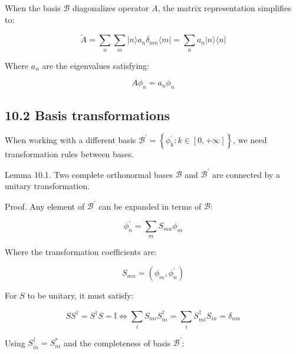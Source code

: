 \documentclass[10pt]{article}
\begin{document}
When the basis $\mathcal{B}$ diagonalizes operator $A$, the matrix representation simplifies to:

\begin{equation*}
\tilde{A}=\sum_{n} \sum_{m}|n\rangle a_{n} \delta_{n m}\langle m|=\sum_{n} a_{n}|n\rangle\langle n| \tag{10.9}
\end{equation*}

Where $a_n$ are the eigenvalues satisfying:

\begin{equation*}
A \phi_{n}=a_{n} \phi_{n} \tag{10.10}
\end{equation*}

\subsection*{10.2 Basis transformations}
When working with a different basis $\mathcal{B}^{\prime}=\left\{\phi_{k}^{\prime}: k \in[0,+\infty]\right\}$, we need transformation rules between bases.

Lemma 10.1. Two complete orthonormal bases $\mathcal{B}$ and $\mathcal{B}^{\prime}$ are connected by a unitary transformation.

Proof. Any element of $\mathcal{B}^{\prime}$ can be expanded in terms of $\mathcal{B}$:

\begin{equation*}
\phi_{n}^{\prime}=\sum_{m} S_{m n} \phi_{m} \tag{10.11}
\end{equation*}

Where the transformation coefficients are:

\begin{equation*}
S_{m n}=\left(\phi_{m}, \phi_{n}^{\prime}\right) \tag{10.12}
\end{equation*}

For $S$ to be unitary, it must satisfy:

\begin{equation*}
S S^{\dagger}=S^{\dagger} S=\mathbb{I} \Longleftrightarrow \sum_{i} S_{m i} S_{i n}^{\dagger}=\sum_{i} S_{m i}^{\dagger} S_{i n}=\delta_{n m} \tag{10.13}
\end{equation*}

Using $S_{i n}^{\dagger}=S_{n i}^{*}$ and the completeness of basis $\mathcal{B}^{\prime}$:
\end{document}
